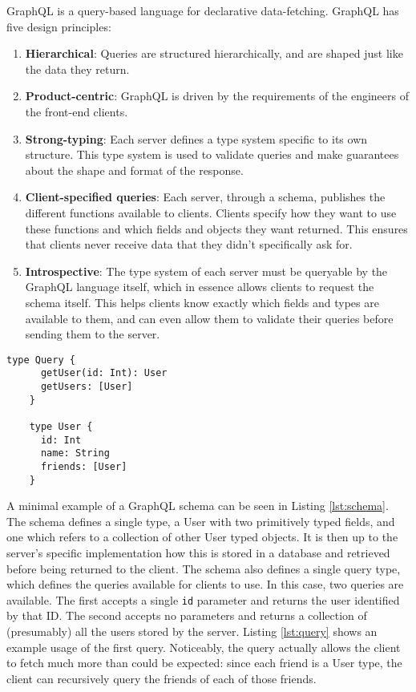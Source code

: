 GraphQL is a query-based language for declarative data-fetching. GraphQL has five design principles:
\begin{enumerate}
    \item \textbf{Hierarchical}: Queries are structured hierarchically, and are shaped just like the data they return.
    \item \textbf{Product-centric}: GraphQL is driven by the requirements of the engineers of the front-end clients.
    \item \textbf{Strong-typing}: Each server defines a type system specific to its own structure. This type system is used to validate queries and make guarantees about the shape and format of the response.
    \item \textbf{Client-specified queries}: Each server, through a schema, publishes the different functions available to clients. Clients specify how they want to use these functions and which fields and objects they want returned. This ensures that clients never receive data that they didn't specifically ask for.
    \item \textbf{Introspective}: The type system of each server must be queryable by the GraphQL language itself, which in essence allows clients to request the schema itself. This helps clients know exactly which fields and types are available to them, and can even allow them to validate their queries before sending them to the server.
\end{enumerate}

\begin{lstlisting}[caption={An example GraphQL schema}, captionpos=b,label={lst:schema}]
    type Query {
      getUser(id: Int): User
      getUsers: [User]
    }
    
    type User {
      id: Int
      name: String
      friends: [User]
    }
\end{lstlisting}
A minimal example of a GraphQL schema can be seen in Listing \ref{lst:schema}. The schema defines a single type, a User with two primitively typed fields, and one which refers to a collection of other User typed objects. It is then up to the server's specific implementation how this is stored in a database and retrieved before being returned to the client. The schema also defines a single query type, which defines the queries available for clients to use. In this case, two queries are available. The first accepts a single \texttt{id} parameter and returns the user identified by that ID. The second accepts no parameters and returns a collection of (presumably) all the users stored by the server. Listing \ref{lst:query} shows an example usage of the first query. Noticeably, the query actually allows the client to fetch much more than could be expected: since each friend is a User type, the client can recursively query the friends of each of those friends.

